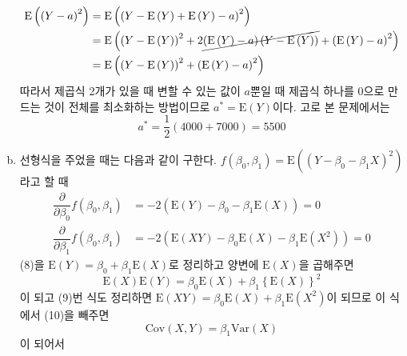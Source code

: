 \documentclass[answers]{exam}
\begin{document}
\begin{questions}
\begin{solution}
\begin{enumerate}[(a)]
      \begin{align}
        \mathrm{E}\left(\left(Y-a\right)^{2}\right) &= \mathrm{E}\left(\left(Y-\mathrm{E}\left(Y\right)+\mathrm{E}\left(Y\right)-a\right)^{2}\right)\\
        &= \mathrm{E}\left( \left(Y-\mathrm{E}\left(Y\right)\right)^{2}+2\cancel{\left(\mathrm{E}\left(Y\right)-a\right)\left(Y-\mathrm{E}\left(Y\right)\right)}+\left(\mathrm{E}\left(Y\right)-a\right)^{2}\right)\\
        &= \mathrm{E}\left( \left(Y-\mathrm{E}\left(Y\right)\right)^{2}+\left(\mathrm{E}\left(Y\right)-a\right)^{2}\right)
      \end{align}
      따라서 제곱식 2개가 있을 때 변할 수 있는 값이 $a$뿐일 때 제곱식 하나를 $0$으로 만드는 것이 전체를 최소화하는 방법이므로 $a^{*}=\mathrm{E}\left(Y\right)$이다. 고로 본 문제에서는
      \begin{equation}
        a^{*}=\dfrac{1}{2}\left(4000+7000\right)= 5500
      \end{equation}
      \item 선형식을 주었을 때는 다음과 같이 구한다. $f\left(\beta_{0},\beta_{1}\right)=\mathrm{E}\left(\left(Y-\beta_{0}-\beta_{1}X\right)^{2}\right)$라고 할 때
      \begin{align}
        \dfrac{\partial}{\partial \beta_{0}}f\left(\beta_{0},\beta_{1}\right) &= -2\left(\mathrm{E}\left(Y\right)-\beta_{0}-\beta_{1}\mathrm{E}\left(X\right)\right)=0\\
        \dfrac{\partial}{\partial \beta_{1}}f\left(\beta_{0},\beta_{1}\right) &= -2\left(\mathrm{E}\left(XY\right)-\beta_{0}\mathrm{E}\left(X\right)-\beta_{1}\mathrm{E}\left(X^{2}\right)\right)=0
      \end{align}
      (8)을 $\mathrm{E}\left(Y\right)=\beta_{0}+\beta_{1}\mathrm{E}\left(X\right)$로 정리하고 양변에 $\mathrm{E}\left(X\right)$을 곱해주면
      \begin{equation}
        \mathrm{E}\left(X\right)\mathrm{E}\left(Y\right) = \beta_{0}\mathrm{E}\left(X\right)+\beta_{1}\left\{\mathrm{E}\left(X\right)\right\}^{2}
      \end{equation}
      이 되고 (9)번 식도 정리하면 $\mathrm{E}\left(XY\right)=\beta_{0}\mathrm{E}\left(X\right)+\beta_{1}\mathrm{E}\left(X^{2}\right)$이 되므로 이 식에서 (10)을 빼주면
      \begin{equation}
        \mathrm{Cov}\left(X,Y\right) = \beta_{1}\mathrm{Var}\left(X\right)
      \end{equation}
      이 되어서
      \begin{equation}

\end{equation}
\end{enumerate}
\end{solution}
\end{questions}
\end{document}
